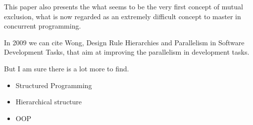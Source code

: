 This paper also presents the what seems to be the very first concept of mutual exclusion, what is now regarded as an extremely difficult concept to master in concurrent programming.

In 2009 we can cite Wong, Design Rule Hierarchies and Parallelism in Software Development Tasks, that aim at improving the parallelism in development tasks.


But I am sure there is a lot more to find.
\begin{itemize}
  \item Structured Programming
  \item Hierarchical structure
  \item OOP
\end{itemize}





\endinput


Making state explicit for imperative big data processing \cite{Fernandez2014a}

Prospect: Finding and Exploiting Parallelism in a Productivity Language for Scientific Computing
http://2015.splashcon.org/event/splash2015-splash-i-lindsey-kuper-talk

Where is software headed ? \cite{Lewis1995}
-> Comparison between academic and industrial roadmap for software.

Now every programming languages use pass-by-reference, or pass-by-sharing to make use of the common memory storage.
Developers were always comfortable with this kind of storage abstraction.
It made sequential programming almost as efficient, and sometimes more, than parallel programming because of the optimization on sequential programming, and the difficulty and the lack of optimization of parallel programming.



I need to show that the 1) languages the more used are sequential with a common memory storage, because 2) it is inherently difficult to program with distributed memory storage.
3) I need to show that the best practice of software development require this common memory storage.

See Object calisthenics 
- http://williamdurand.fr/2013/06/03/object-calisthenics/
- http://www.cs.helsinki.fi/u/luontola/tdd-2009/ext/ObjectCalisthenics.pdf